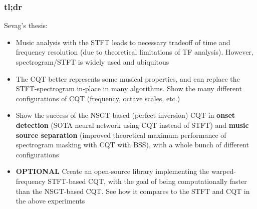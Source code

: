 \documentclass[usenames,dvipsnames]{beamer}
\begin{document}
\begin{frame}
	\frametitle{tl;dr}
	Sevag's thesis:
	\begin{itemize}
		\item
			Music analysis with the STFT leads to necessary tradeoff of time and frequency resolution (due to theoretical limitations of TF analysis). However, spectrogram/STFT is widely used and ubiquitous
		\item
			The CQT better represents some musical properties, and can replace the STFT-spectrogram in-place in many algorithms. Show the many different configurations of CQT (frequency, octave scales, etc.)
		\item
			Show the success of the NSGT-based (perfect inversion) CQT in \textbf{onset detection} (SOTA neural network using CQT instead of STFT) and \textbf{music source separation} (improved theoretical maximum performance of spectrogram masking with CQT with BSS), with a whole bunch of different configurations
		\item
			\textbf{OPTIONAL} Create an open-source library implementing the warped-frequency STFT-based CQT, with the goal of being computationally faster than the NSGT-based CQT. See how it compares to the STFT and CQT in the above experiments
	\end{itemize}
\end{frame}
\end{document}

